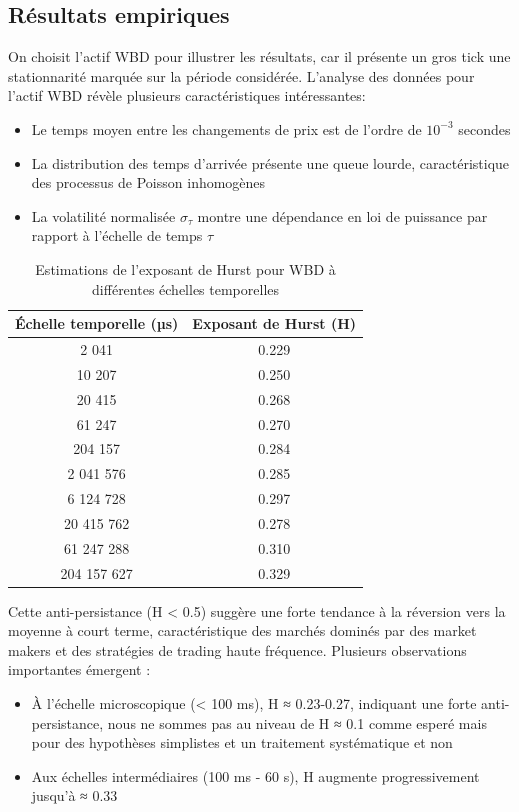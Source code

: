 \documentclass[10pt,a4paper]{article}
\theoremstyle{definition}
\theoremstyle{remark}
\begin{document}
\begin{itemize}
\subsection{Résultats empiriques}

On choisit l'actif WBD pour illustrer les résultats, car il présente un gros tick une stationnarité marquée sur la période considérée.
L'analyse des données pour l'actif WBD révèle plusieurs caractéristiques intéressantes:

\begin{itemize}
    \item Le temps moyen entre les changements de prix est de l'ordre de \(10^{-3}\) secondes
    \item La distribution des temps d'arrivée présente une queue lourde, caractéristique des processus de Poisson inhomogènes
    \item La volatilité normalisée \(\sigma_{\tau}\) montre une dépendance en loi de puissance par rapport à l'échelle de temps \(\tau\)
\end{itemize}
\begin{table}[h!]
\centering
\begin{tabular}{|c|c|}
\hline
\textbf{Échelle temporelle (µs)} & \textbf{Exposant de Hurst (H)} \\
\hline
2 041 & 0.229 \\
10 207 & 0.250 \\
20 415 & 0.268 \\
61 247 & 0.270 \\
204 157 & 0.284 \\
2 041 576 & 0.285 \\
6 124 728 & 0.297 \\
20 415 762 & 0.278 \\
61 247 288 & 0.310 \\
204 157 627 & 0.329 \\
\hline
\end{tabular}
\caption{Estimations de l'exposant de Hurst pour WBD à différentes échelles temporelles}
\label{tab:hurst_exponents}
\end{table}

Cette anti-persistance (H < 0.5) suggère une forte tendance à la réversion vers la moyenne à court terme, caractéristique des marchés dominés par des market makers et des stratégies de trading haute fréquence. Plusieurs observations importantes émergent :

\begin{itemize}
    \item À l'échelle microscopique (< 100 ms), H ≈ 0.23-0.27, indiquant une forte anti-persistance, nous ne sommes pas au niveau de H ≈ 0.1 comme esperé mais pour des hypothèses simplistes et un traitement systématique et non 
    \item Aux échelles intermédiaires (100 ms - 60 s), H augmente progressivement jusqu'à ≈ 0.33
\end{itemize}


\end{itemize}
\end{document}
